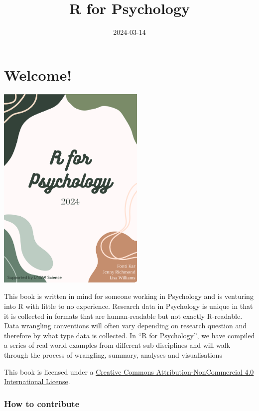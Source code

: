 \documentclass[
  letterpaper,
  DIV=11,
  numbers=noendperiod]{scrreprt}
\title{R for Psychology}
\author{}
\date{2024-03-14}
\renewcommand*\contentsname{Table of contents}
\newcommand\contentsname{Table of contents}
\begin{document}
\maketitle

\renewcommand*\contentsname{Table of contents}
{
\hypersetup{linkcolor=}
\setcounter{tocdepth}{2}
\tableofcontents
}

\chapter*{Welcome!}\label{welcome}


\includegraphics[width=2.78125in,height=\textheight]{images/cover.png}

This book is written in mind for someone working in Psychology and is
venturing into R with little to no experience. Research data in
Psychology is unique in that it is collected in formats that are
human-readable but not exactly R-readable. Data wrangling conventions
will often vary depending on research question and therefore by what
type data is collected. In ``R for Psychology'', we have compiled a
series of real-world examples from different sub-disciplines and will
walk through the process of wrangling, summary, analyses and
visualisations

This book is licensed under a
\href{https://creativecommons.org/licenses/by-nc/4.0/}{Creative Commons
Attribution-NonCommercial 4.0 International License}.

\subsection*{How to contribute}\label{how-to-contribute}
\end{document}
